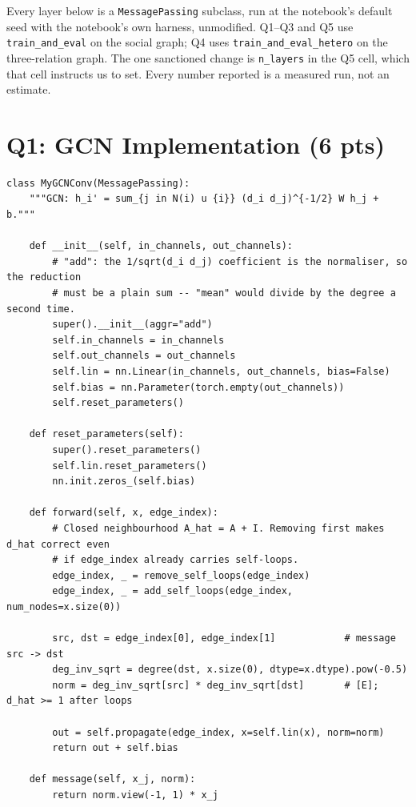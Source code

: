 

Every layer below is a \texttt{MessagePassing} subclass, run at the notebook's default
seed with the notebook's own harness, unmodified. Q1--Q3 and Q5 use
\texttt{train\_and\_eval} on the social graph; Q4 uses
\texttt{train\_and\_eval\_hetero} on the three-relation graph. The one sanctioned
change is \texttt{n\_layers} in the Q5 cell, which that cell instructs us to set.
Every number reported is a measured run, not an estimate.

\section*{Q1: GCN Implementation (6 pts)}

\begin{lstlisting}[style=p1pystyle]
class MyGCNConv(MessagePassing):
    """GCN: h_i' = sum_{j in N(i) u {i}} (d_i d_j)^{-1/2} W h_j + b."""

    def __init__(self, in_channels, out_channels):
        # "add": the 1/sqrt(d_i d_j) coefficient is the normaliser, so the reduction
        # must be a plain sum -- "mean" would divide by the degree a second time.
        super().__init__(aggr="add")
        self.in_channels = in_channels
        self.out_channels = out_channels
        self.lin = nn.Linear(in_channels, out_channels, bias=False)
        self.bias = nn.Parameter(torch.empty(out_channels))
        self.reset_parameters()

    def reset_parameters(self):
        super().reset_parameters()
        self.lin.reset_parameters()
        nn.init.zeros_(self.bias)

    def forward(self, x, edge_index):
        # Closed neighbourhood A_hat = A + I. Removing first makes d_hat correct even
        # if edge_index already carries self-loops.
        edge_index, _ = remove_self_loops(edge_index)
        edge_index, _ = add_self_loops(edge_index, num_nodes=x.size(0))

        src, dst = edge_index[0], edge_index[1]            # message src -> dst
        deg_inv_sqrt = degree(dst, x.size(0), dtype=x.dtype).pow(-0.5)
        norm = deg_inv_sqrt[src] * deg_inv_sqrt[dst]       # [E]; d_hat >= 1 after loops

        out = self.propagate(edge_index, x=self.lin(x), norm=norm)
        return out + self.bias

    def message(self, x_j, norm):
        return norm.view(-1, 1) * x_j
\end{lstlisting}

